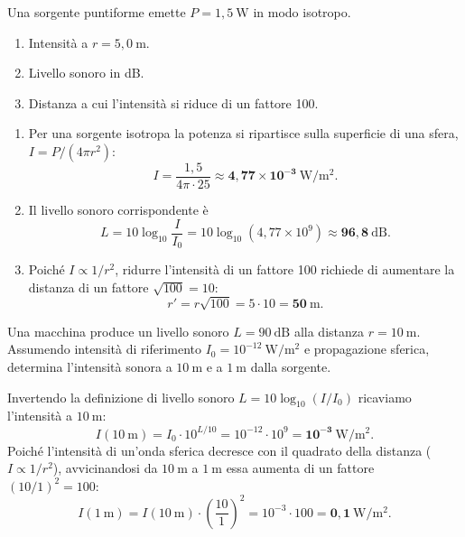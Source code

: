 \begin{question}[ID=5.2, subtitle={Sorgente puntiforme — intensità, livello sonoro e distanza}, tags={suono, intensità, livello sonoro}, difficulty=media]
Una sorgente puntiforme emette $P = 1{,}5\ \mathrm{W}$ in modo isotropo.
\begin{enumerate}
\item Intensità a $r = 5{,}0\ \mathrm{m}$.
\item Livello sonoro in dB.
\item Distanza a cui l'intensità si riduce di un fattore 100.
\end{enumerate}
\begin{solution}
\begin{enumerate}
\item Per una sorgente isotropa la potenza si ripartisce sulla superficie di una sfera, $I = P/(4\pi r^2)$:
\[
I = \frac{1{,}5}{4\pi\cdot 25} \approx \mathbf{4{,}77\times10^{-3}\ \mathrm{W/m^2}}.
\]
\item Il livello sonoro corrispondente è
\[
L = 10\log_{10}\frac{I}{I_0} = 10\log_{10}(4{,}77\times10^9) \approx \mathbf{96{,}8\ \mathrm{dB}}.
\]
\item Poiché $I \propto 1/r^2$, ridurre l'intensità di un fattore 100 richiede di aumentare la distanza di un fattore $\sqrt{100} = 10$:
\[
r' = r\sqrt{100} = 5\cdot 10 = \mathbf{50\ \mathrm{m}}.
\]
\end{enumerate}
\end{solution}
\end{question}

\begin{question}[ID=5.3, subtitle={Macchina a 90 dB: intensità a 10 m e a 1 m}, tags={livello sonoro, logaritmi}, difficulty=difficile]
Una macchina produce un livello sonoro $L = 90\ \mathrm{dB}$ alla distanza $r = 10\ \mathrm{m}$. Assumendo intensità di riferimento $I_0 = 10^{-12}\ \mathrm{W/m^2}$ e propagazione sferica, determina l'intensità sonora a $10\ \mathrm{m}$ e a $1\ \mathrm{m}$ dalla sorgente.
\begin{solution}
Invertendo la definizione di livello sonoro $L = 10\log_{10}(I/I_0)$ ricaviamo l'intensità a $10\ \mathrm{m}$:
\[
I(10\ \mathrm{m}) = I_0\cdot 10^{L/10} = 10^{-12}\cdot 10^{9} = \mathbf{10^{-3}\ \mathrm{W/m^2}}.
\]
Poiché l'intensità di un'onda sferica decresce con il quadrato della distanza ($I \propto 1/r^2$), avvicinandosi da $10\ \mathrm{m}$ a $1\ \mathrm{m}$ essa aumenta di un fattore $(10/1)^2 = 100$:
\[
I(1\ \mathrm{m}) = I(10\ \mathrm{m})\cdot\left(\frac{10}{1}\right)^2 = 10^{-3}\cdot 100 = \mathbf{0{,}1\ \mathrm{W/m^2}}.
\]
\end{solution}
\end{question}

